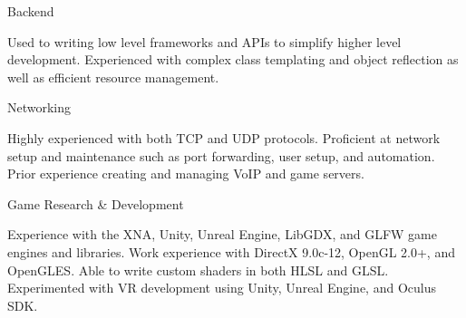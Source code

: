 \vspace{-5mm}

\begin{cventries}

  \cventry
    {}
    {Backend}
    {}
    {}
    {
      \vspace{-5mm}
      \begin{cvitems}
        \item {Used to writing low level frameworks and APIs to simplify higher level development. %
        Experienced with complex class templating and object reflection as well as %
        efficient resource management.}
      \end{cvitems}
    }
    \vspace{-1.8mm}
    \cventry
      {}
      {Networking}
      {}
      {}
      {
        \vspace{-5mm}
        \begin{cvitems}
          \item {Highly experienced with both TCP and UDP protocols. %
          Proficient at network setup and maintenance such as port forwarding, user %
          setup, and automation. Prior experience creating and managing VoIP and game servers.}
        \end{cvitems}
      }
      \vspace{-1.8mm}
      \cventry
        {}
        {Game Research \& Development}
        {}
        {}
        {
          \vspace{-5mm}
          \begin{cvitems}
            \item {Experience with the XNA, Unity, Unreal Engine, LibGDX, and GLFW game engines and %
            libraries. Work experience with DirectX 9.0c-12, OpenGL 2.0+, and OpenGLES. Able %
            to write custom shaders in both HLSL and GLSL. Experimented with VR development %
            using Unity, Unreal Engine, and Oculus SDK.}
          \end{cvitems}
        }

\end{cventries}
\vspace{-5mm}
